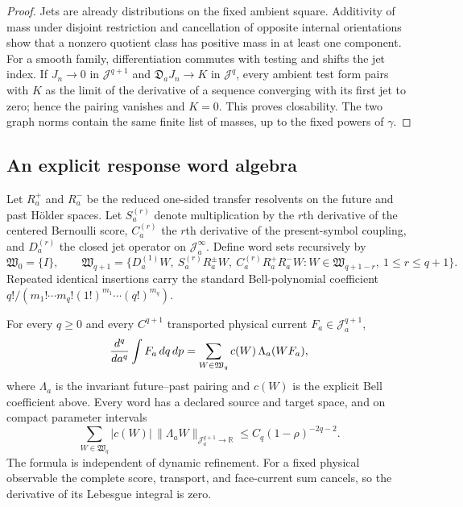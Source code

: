 \begin{proof}
Jets are already distributions on the fixed ambient square.  Additivity of
mass under disjoint restriction and cancellation of opposite internal
orientations show that a nonzero quotient class has positive mass in at least
one component.  For a smooth family, differentiation commutes with testing
and shifts the jet index.  If \(J_n\to0\) in \(\mathscr J^{q+1}\) and
\(\mathfrak D_aJ_n\to K\) in \(\mathscr J^q\), every ambient test form pairs
with \(K\) as the limit of the derivative of a sequence converging with its
first jet to zero; hence the pairing vanishes and \(K=0\).  This proves
closability.  The two graph norms contain the same finite list of masses, up
to the fixed powers of \(\gamma\).
\end{proof}

\subsection{An explicit response word algebra}

Let \(R_a^+\) and \(R_a^-\) be the reduced one-sided transfer resolvents on
the future and past H\"older spaces.  Let \(S_a^{(r)}\) denote multiplication
by the \(r\)th derivative of the centered Bernoulli score, \(C_a^{(r)}\) the
\(r\)th derivative of the present-symbol coupling, and
\(D_a^{(r)}\) the closed jet operator on \(\mathscr J_a^\infty\).
Define word sets recursively by
\[
 \mathfrak W_0=\{I\},
 \qquad
 \mathfrak W_{q+1}
 =\{D_a^{(1)}W,\ S_a^{(r)}R_a^\pm W,\ C_a^{(r)}R_a^+R_a^-W:
       W\in\mathfrak W_{q+1-r},\ 1\le r\le q+1\}.
\]
Repeated identical insertions carry the standard Bell-polynomial coefficient
\(q!/(m_1!\cdots m_q!(1!)^{m_1}\cdots(q!)^{m_q})\).

\begin{theorem}
\label{thm:r16-a1-response}
For every \(q\ge0\) and every \(C^{q+1}\) transported physical current
\(F_a\in\mathscr J_a^{q+1}\),
\[
 {d^q\over da^q}\int F_a\,dq\,dp
 =\sum_{W\in\mathfrak W_q}c(W)\,\Lambda_a(WF_a),
\]
where \(\Lambda_a\) is the invariant future--past pairing and \(c(W)\) is the
explicit Bell coefficient above.  Every word has a declared source and target
space, and on compact parameter intervals
\[
 \sum_{W\in\mathfrak W_q}|c(W)|\,
   \|\Lambda_aW\|_{\mathscr J_a^{q+1}\to\mathbb R}
 \le C_q(1-\rho)^{-2q-2}.
\]
The formula is independent of dynamic refinement.  For a fixed physical
observable the complete score, transport, and face-current sum cancels, so the
derivative of its Lebesgue integral is zero.
\end{theorem}

